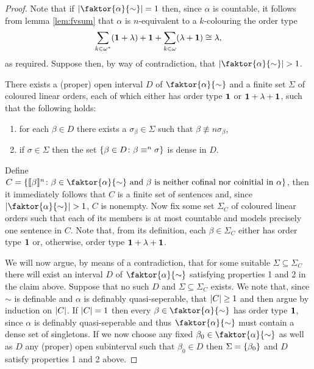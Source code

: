 \begin{proof}
		Note that if $\card{\faktor{\alpha}{\sim}}=1$ then, since $\alpha$ is countable, it follows from lemma \ref{lem:fvsum} that $\alpha$ is $n$-equivalent to a $k$-colouring the order type
		\begin{equation}
			\sum_{k\in{\omega}^\ast}(\mathbf{1}+\lambda)+\mathbf{1}+\sum_{k\in\omega}(\lambda+\mathbf{1})\cong\lambda,
		\end{equation}
		as required.  Suppose then, by way of contradiction, that $\card{\faktor{\alpha}{\sim}}>1$.
		\begin{claim}
			There exists a (proper) open interval $D$ of $\faktor{\alpha}{\sim}$ and a finite set $\Sigma$ of coloured linear orders, each of which either has order type $\mathbf{1}$ or $\mathbf{1}+\lambda+\mathbf{1}$, such that the following holds:
			\begin{enumerate}[nosep]
				\item for each $\beta\in D$ there exists a $\sigma_\beta\in\Sigma$  such that $\beta\nequiv{n}\sigma_\beta$,

				\item if $\sigma\in\Sigma$ then the set $\left\lbrace \beta\in D\colon \beta\equiv^{n}\sigma \right\rbrace$ is dense in $D$.
			\end{enumerate}
		\end{claim}

		Define $C=\setbuild{\cha{\beta}{n}}{\beta\in\faktor{\alpha}{\sim}\text{ and }\beta\text{ is neither cofinal nor coinitial in }\alpha}$, then it immediately follows that $C$ is a finite set of sentences and, since $\card{\faktor{\alpha}{\sim}}>1$, $C$ is nonempty.  Now fix some set $\Sigma_C$ of coloured linear orders such that each of its members is at most countable and models precisely one sentence in $C$.  Note that, from its definition, each $\beta\in\Sigma_C$ either has order type $\mathbf{1}$ or, otherwise, order type $\mathbf{1}+\lambda+\mathbf{1}$.

		We will now argue, by means of a contradiction, that for some suitable $\Sigma\subseteq\Sigma_C$ there will exist an interval $D$ of $\faktor{\alpha}{\sim}$ satisfying properties 1 and 2 in the claim above.  Suppose that no such $D$ and $\Sigma\subseteq\Sigma_C$ exists.  We note that, since $\sim$ is definable and $\alpha$ is definably quasi-seperable, that $\left\lvert C\right\rvert\geq 1$ and then argue by induction on $\left\lvert C\right\rvert$.  If $\left\lvert C\right\rvert=1$ then every $\beta\in\faktor{\alpha}{\sim}$ has order type $\mathbf{1}$, since $\alpha$ is definably quasi-seperable and thus $\faktor{\alpha}{\sim}$ must contain a dense set of singletons.  If we now choose any fixed $\beta_0\in\faktor{\alpha}{\sim}$ as well as $D$ any (proper) open subinterval such that $\beta_0\in D$ then $\Sigma=\left\lbrace \beta_0\right\rbrace$ and $D$ satisfy properties 1 and 2 above.


\end{proof}
